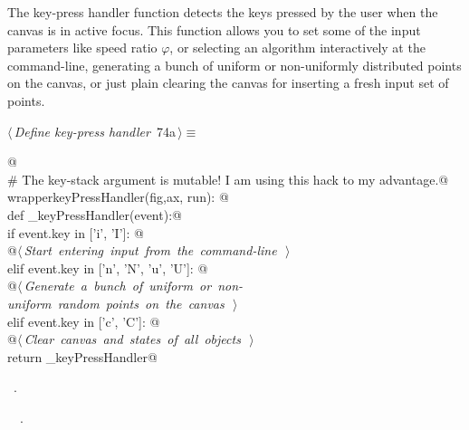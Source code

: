 \documentclass[11.5pt]{report}
\begin{document}
\vspace{-0.8cm}\newchunk The key-press handler function detects the keys pressed by the user when the canvas
is in active focus. This function allows you to set some of the input parameters like 
speed ratio $\varphi$, or selecting an algorithm interactively at the command-line, 
generating a bunch of uniform or non-uniformly distributed points on the canvas, 
or just plain clearing the canvas for inserting a fresh input set of points. 

\begin{flushleft} \small
\begin{minipage}{\linewidth}\label{scrap102}\raggedright\small
{} $\langle\,${\itshape Define key-press handler}\nobreak\ {\footnotesize {74a}}$\,\rangle\equiv$
\vspace{-1ex}
\begin{list}{}{} \item
\mbox{}\verb@   @\\
\mbox{}\verb@# The key-stack argument is mutable! I am using this hack to my advantage.@\\
\mbox{}\verb@def wrapperkeyPressHandler(fig,ax, run): @\\
\mbox{}\verb@       def _keyPressHandler(event):@\\
\mbox{}\verb@           if event.key in ['i', 'I']:  @\\
\mbox{}\verb@                @\hbox{$\langle\,${\itshape Start entering input from the command-line}\nobreak\ {\footnotesize {}}$\,\rangle$}\verb@@\\
\mbox{}\verb@           elif event.key in ['n', 'N', 'u', 'U']: @\\
\mbox{}\verb@                @\hbox{$\langle\,${\itshape Generate a bunch of uniform or non-uniform random points on the canvas}\nobreak\ {\footnotesize {}}$\,\rangle$}\verb@@\\
\mbox{}\verb@           elif event.key in ['c', 'C']: @\\
\mbox{}\verb@                @\hbox{$\langle\,${\itshape Clear canvas and states of all objects}\nobreak\ {\footnotesize {}}$\,\rangle$}\verb@@\\
\mbox{}\verb@       return _keyPressHandler@\\
\mbox{}\verb@@{\NWsep}
\end{list}
\vspace{-1.5ex}
\footnotesize
\begin{list}{}{\setlength{\itemsep}{-\parsep}\setlength{\itemindent}{-\leftmargin}}
\item \NWtxtMacroRefIn\ .
\item \NWtxtIdentsDefed\nobreak\  \verb@wrapperkeyPressHandler@\nobreak\ .
\item{}
\end{list}
\end{minipage}\vspace{4ex}
\end{flushleft}
\end{document}
